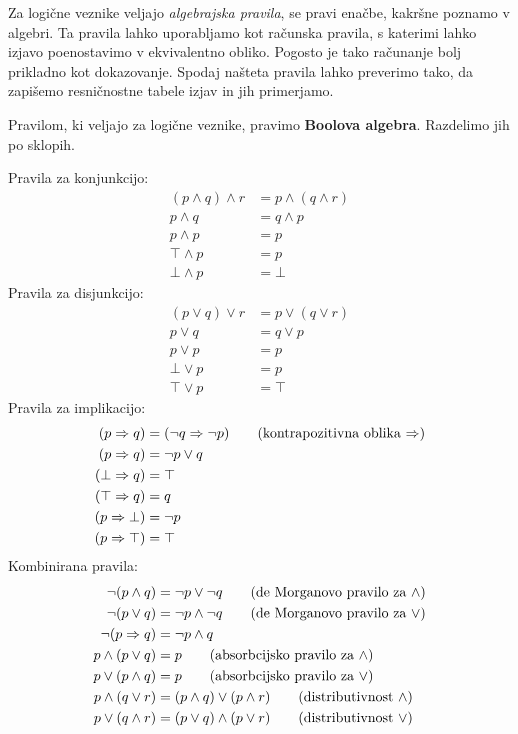 Za logične veznike veljajo \emph{algebrajska pravila}, se pravi enačbe, kakršne poznamo v algebri. Ta pravila lahko uporabljamo kot računska pravila, s katerimi lahko izjavo poenostavimo v ekvivalentno obliko. Pogosto je tako računanje bolj prikladno kot dokazovanje. Spodaj našteta pravila lahko preverimo tako, da zapišemo resničnostne tabele izjav in jih primerjamo.

Pravilom, ki veljajo za logične veznike, pravimo \textbf{Boolova algebra}.
Razdelimo jih po sklopih.

Pravila za konjunkcijo:
%
\begin{align}
  (p \land q) \land r &= p \land (q \land r) \tag{asociativnost $\land$} \\
  p \land q &= q \land p \tag{komutativnost $\land$} \\
  p \land p &= p \tag{idempotentnost $\land$} \\
  \top \land p &= p \tag{$\top$ je nevtralen za $\land$} \\
  \bot \land p &= \bot \tag{$\bot$ absorbira $\land$}
\end{align}
%
Pravila za disjunkcijo:
%
\begin{align}
  (p \lor q) \lor r &= p \lor (q \lor r) \tag{asociativnost $\lor$} \\
  p \lor q &= q \lor p \tag{komutativnost $\lor$} \\
  p \lor p &= p \tag{idempotentnost $\lor$} \\
  \bot \lor p &= p \tag{$\bot$ je nevtralen za $\lor$} \\
  \top \lor p &= \top \tag{$\top$ absorbira $\lor$}
\end{align}
%
Pravila za implikacijo:
%
\begin{align}
  (p \lthen q) &= (\neg q \lthen \neg p) \tag{kontrapozitivna oblika $\lthen$}\\
  (p \lthen q) &= \neg p \lor q \notag \\
  (\bot \lthen q) &= \top \notag \\
  (\top \lthen q) &= q \notag \\
  (p \lthen \bot) &= \neg p \notag \\
  (p \lthen \top) &= \top \notag
\end{align}
%
Kombinirana pravila:
%
\begin{align}
  \neg(p \land q) &= \neg p \lor \neg q \tag{de Morganovo pravilo za $\land$} \\
  \neg(p \lor q) &= \neg p \land \neg q \tag{de Morganovo pravilo za $\lor$} \\
  \neg(p \Rightarrow q) &= \neg p \land q \notag \\
  p \land (p \lor q) &= p \tag{absorbcijsko pravilo za $\land$}\\
  p \lor (p \land q) &= p \tag{absorbcijsko pravilo za $\lor$} \\
  p \land (q \lor r) &= (p \land q) \lor (p \land r) \tag{distributivnost $\land$}\\
  p \lor (q \land r) &= (p \lor q) \land (p \lor r) \tag{distributivnost $\lor$}
\end{align}
